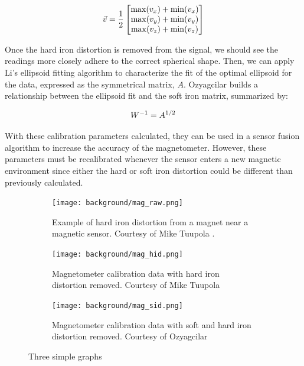 \begin{equation} \labeq{hard_iron_offset}
    \vec{v}=\frac{1}{2}
    \begin{bmatrix}
        \max(v_x)+\min(v_x) \\
        \max(v_y)+\min(v_y) \\
        \max(v_z)+\min(v_z)
    \end{bmatrix}
\end{equation}

Once the hard iron distortion is removed from the signal, we should see the readings more closely adhere to the correct spherical shape. 
Then, we can apply Li’s ellipsoid fitting algorithm \cite{Li:2004} to characterize the fit of the optimal ellipsoid for the data, expressed as the symmetrical matrix, $A$. 
Ozyagcilar \cite{Ozyagcilar:2015} builds a relationship between the ellipsoid fit and the soft iron matrix, summarized by:

\begin{equation} \labeq{soft_iron_matrix}
    W^{-1}=A^{1/2}
\end{equation}

With these calibration parameters calculated, they can be used in a sensor fusion algorithm to increase the accuracy of the magnetometer. 
However, these parameters must be recalibrated whenever the sensor enters a new magnetic environment since either the hard or soft iron distortion could be different than previously calculated.

\begin{figure}
    \centering
    \begin{subfigure}[b]{0.3\textwidth}
        \centering
        \texttt{[image: background/mag\_raw.png]}
        \caption[Raw Magnetometer Readings]{Example of hard iron distortion from a magnet near a magnetic sensor. Courtesy of Mike Tuupola \cite{Tuupola:2018}.}
    \end{subfigure}
    \hfill
    \begin{subfigure}[b]{0.3\textwidth}
        \centering
        \texttt{[image: background/mag\_hid.png]}
        \caption[Hard Iron Distortion Removed]{Magnetometer calibration data with hard iron distortion removed. Courtesy of Mike Tuupola \cite{Tuupola:2018}}
    \end{subfigure}
    \hfill
    \begin{subfigure}[b]{0.3\textwidth}
        \centering
        \texttt{[image: background/mag\_sid.png]}
        \caption[Soft Iron Distortion Removed]{Magnetometer calibration data with soft and hard iron distortion removed. Courtesy of Ozyagcilar \cite{Ozyagcilar:2015}}
    \end{subfigure}
       \caption{Three simple graphs}
\end{figure}

